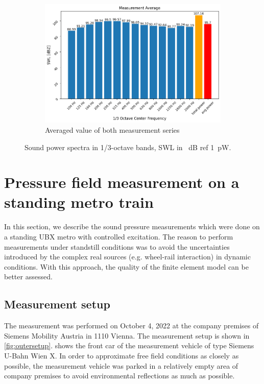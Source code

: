 \begin{figure}[H]\ContinuedFloat
     \centering
     \begin{subfigure}[b]{0.9\textwidth}
         \centering
         \includegraphics[width=\linewidth]{fig/SWL_average.png}
         \caption{Averaged value of both measurement series}
         \label{fig:average_SWL}
     \end{subfigure}
     
        \caption{Sound power spectra in 1/3-octave bands, SWL in \SI{}{\dB} ref \SI{1}{\pico\watt}.}
        \label{fig:SWL}
\end{figure}


\section{Pressure field measurement on a standing metro train}
\label{sec:pressure_field_measurement}

In this section, we describe the sound pressure measurements which were done on a standing UBX metro with controlled excitation.
The reason to perform measurements under standstill conditions was to avoid the uncertainties introduced by the complex real sources (e.g. wheel-rail interaction) in dynamic conditions. With this approach, the quality of the finite element model can be better assessed.

\subsection*{Measurement setup}

The measurement was performed on October 4, 2022 at the company premises of Siemens Mobility Austria in 1110 Vienna. The measurement setup is shown in \cref{fig:outersetup}.  shows the front car of the measurement vehicle of type Siemens U-Bahn Wien X. In order to approximate free field conditions as closely as possible, the measurement vehicle was parked in a relatively empty area of company premises to avoid environmental reflections as much as possible.

